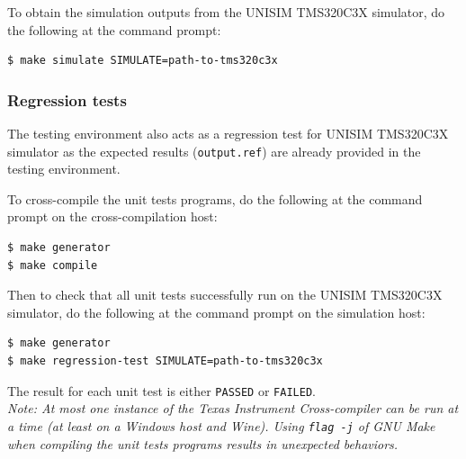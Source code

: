 \vspace{0.5cm}

To obtain the simulation outputs from the UNISIM TMS320C3X simulator, do the following at the command prompt:
\begin{verbatim}
$ make simulate SIMULATE=path-to-tms320c3x
\end{verbatim}

\subsubsection{Regression tests}
\label{tms320c3x_regression_tests}

The testing environment also acts as a regression test for UNISIM TMS320C3X simulator as the expected results (\texttt{output.ref}) are already provided in the testing environment.

To cross-compile the unit tests programs, do the following at the command prompt on the cross-compilation host:
\begin{verbatim}
$ make generator
$ make compile
\end{verbatim}

Then to check that all unit tests successfully run on the UNISIM TMS320C3X simulator, do the following at the command prompt on the simulation host:
\begin{verbatim}
$ make generator
$ make regression-test SIMULATE=path-to-tms320c3x
\end{verbatim}

\noindent The result for each unit test is either \texttt{PASSED} or \texttt{FAILED}.\\

\textit{Note: At most one instance of the Texas Instrument Cross-compiler can be run at a time (at least on a Windows host and Wine).
Using \texttt{flag -j} of GNU Make when compiling the unit tests programs results in unexpected behaviors.}
